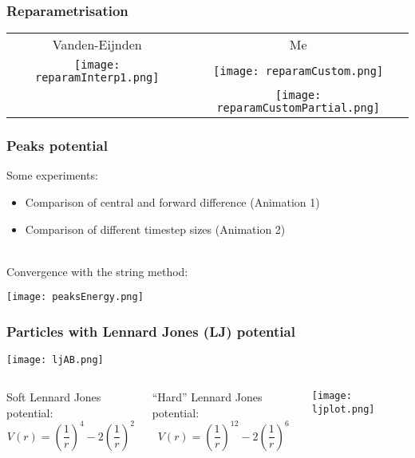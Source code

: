 \documentclass{beamer}
\renewcommand{\(}{\left(}
\renewcommand{\)}{\right)}
\begin{document}
\begin{frame}
\frametitle{Reparametrisation}
\begin{tabular}{cc}
Vanden-Eijnden & Me \\
\texttt{[image: reparamInterp1.png]}&
\texttt{[image: reparamCustom.png]}\\
&
\texttt{[image: reparamCustomPartial.png]}
\end{tabular}
\end{frame}


\begin{frame}
\frametitle{Peaks potential}
Some experiments:
\begin{itemize}
\item Comparison of central and forward difference (Animation 1)
\item Comparison of different timestep sizes (Animation 2)
\end{itemize}
~\\
Convergence with the string method:
\begin{center}
\texttt{[image: peaksEnergy.png]}
\end{center}

\end{frame}

\begin{frame}
\frametitle{Particles with Lennard Jones (LJ) potential }
\vspace{-1.5em}
\begin{center}
\texttt{[image: ljAB.png]}
\end{center}

\begin{columns}[c]
Soft Lennard Jones potential:
$$V(r) = \(\frac{1}{r}\)^4-2\(\frac{1}{r}\)^2$$

``Hard'' Lennard Jones potential:
$$V(r) = \(\frac{1}{r}\)^{12}-2\(\frac{1}{r}\)^6$$

\texttt{[image: ljplot.png]}
\end{columns}

\end{frame}
\end{document}
